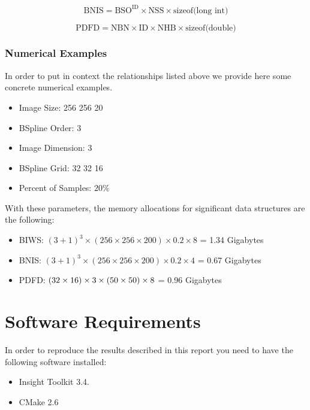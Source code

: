 \documentclass{InsightArticle}
\begin{document}
\begin{equation}
\mbox{BNIS} = \mbox{BSO}^{\mbox{ID}} \times \mbox{NSS} \times \mbox{sizeof(long int)}
\end{equation}

\begin{equation}
\mbox{PDFD} = \mbox{NBN} \times \mbox{ID} \times \mbox{NHB} \times  \mbox{sizeof(double)}
\end{equation}


\subsubsection{Numerical Examples}

In order to put in context the relationships listed above we provide here some
concrete numerical examples.

\begin{itemize}
\item Image Size: 256 256 20
\item BSpline Order: 3
\item Image Dimension: 3
\item BSpline Grid: 32 32 16
\item Percent of Samples: $20\%$
\end{itemize}

With these parameters, the memory allocations for significant data structures
are the following:


\begin{itemize}
\item BIWS: $(3+1)^3 \times (256 \times 256 \times 200 ) \times 0.2 \times 8 $ = 1.34 Gigabytes 
\item BNIS: $(3+1)^3 \times (256 \times 256 \times 200 ) \times 0.2 \times 4 $ = 0.67 Gigabytes 
\item PDFD: $(32 \time 32 \times 16 ) \times 3 \times ( 50 \times 50 ) \times 8$ = 0.96 Gigabytes
\end{itemize}


\section{Software Requirements}

In order to reproduce the results described in this report you need to have the
following software installed:

\begin{itemize}
  \item  Insight Toolkit 3.4.
  \item  CMake 2.6
\end{itemize}
\end{document}
